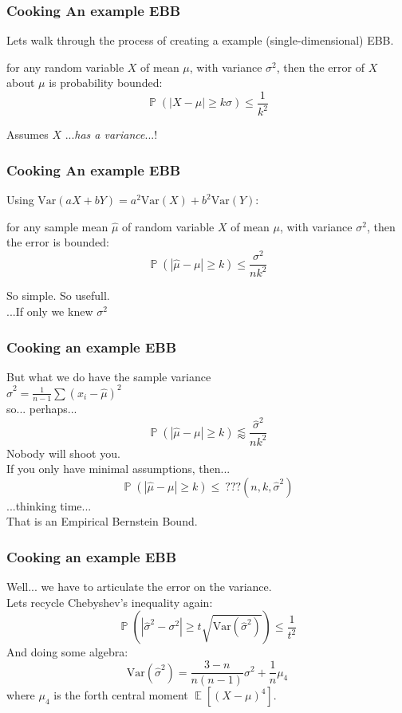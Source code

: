 \documentclass{beamer}
\DeclareMathOperator{\E}{\mathbb{E}}
\DeclareMathOperator{\p}{\mathbb{P}}
\begin{document}
\begin{frame}
\frametitle{Cooking An example EBB}
Lets walk through the process of creating a example (single-dimensional) EBB.\\
\begin{theorem}
for any random variable $X$ of mean $\mu$, with variance $\sigma^2$, then the error of $X$ about $\mu$ is probability bounded:
$$ \p\left(|X-\mu|\ge k\sigma\right)\le\frac{1}{k^2} $$
\end{theorem}
Assumes $X$ ...\textit{has a variance}...!
\end{frame}

\begin{frame}
\frametitle{Cooking An example EBB}
Using $\text{Var}(aX+bY)=a^2\text{Var}(X)+b^2\text{Var}(Y)$:
\begin{theorem}
for any sample mean $\hat{\mu}$ of random variable $X$ of mean $\mu$, with variance $\sigma^2$, then the error is bounded:
$$ \p\left(|\hat{\mu}-\mu|\ge k\right)\le\frac{\sigma^2}{nk^2} $$
\end{theorem}
So simple. So usefull.\\
\-\hspace{1cm} ...If only we knew $\sigma^2$
\end{frame}


\begin{frame}
\frametitle{Cooking an example EBB}
But what we do have the sample variance\\ $\hat{\sigma}^2 = \frac{1}{n-1}\sum(x_i-\hat{\mu})^2$\\
so... perhaps...
$$ \p\left(|\hat{\mu}-\mu|\ge k\right)\lessapprox\frac{\hat{\sigma}^2}{nk^2} $$
Nobody will shoot you.\\
If you only have minimal assumptions, then...
$$ \p\left(|\hat{\mu}-\mu|\ge k\right)\le ~??? (n,k,\hat{\sigma}^2) $$
...thinking time...\\
That is an Empirical Bernstein Bound.
\end{frame}


\begin{frame}
\frametitle{Cooking an example EBB}
Well... we have to articulate the error on the variance.\\
Lets recycle Chebyshev's inequality again:
$$ \p\left(|\hat{\sigma}^2-\sigma^2|\ge t\sqrt{\text{Var}(\hat{\sigma}^2)}\right)\le\frac{1}{t^2} $$
And doing some algebra:
$$ \text{Var}(\hat{\sigma}^2) = \frac{3-n}{n(n-1)}\sigma^2 + \frac{1}{n}\mu_4$$
where $\mu_4$ is the forth central moment $\E[(X-\mu)^4]$.\\
\end{frame}
\end{document}
